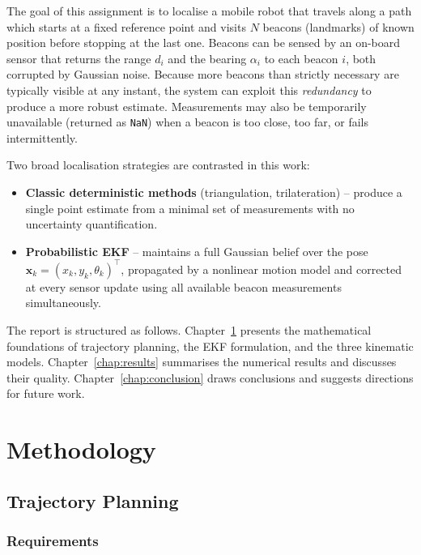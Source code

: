 \documentclass[a4paper,11pt]{report}
\begin{document}
The goal of this assignment is to localise a mobile robot that travels along a path which starts at a fixed reference point and visits $N$ beacons (landmarks) of known position before stopping at the last one.  Beacons can be sensed by an on-board sensor that returns the range $d_i$ and the bearing $\alpha_i$ to each beacon $i$, both corrupted by Gaussian noise.  Because more beacons than strictly necessary are typically visible at any instant, the system can exploit this \emph{redundancy} to produce a more robust estimate.  Measurements may also be temporarily unavailable (returned as \texttt{NaN}) when a beacon is too close, too far, or fails intermittently.

Two broad localisation strategies are contrasted in this work:
\begin{itemize}
  \item \textbf{Classic deterministic methods} (triangulation, trilateration) -- produce a single point estimate from a minimal set of measurements with no uncertainty quantification.
  \item \textbf{Probabilistic EKF} -- maintains a full Gaussian belief over the pose $\bm{x}_k = (x_k, y_k, \theta_k)^\top$, propagated by a nonlinear motion model and corrected at every sensor update using all available beacon measurements simultaneously.
\end{itemize}

The report is structured as follows.  Chapter~\ref{chap:methodology} presents the mathematical foundations of trajectory planning, the EKF formulation, and the three kinematic models.  Chapter~\ref{chap:results} summarises the numerical results and discusses their quality.  Chapter~\ref{chap:conclusion} draws conclusions and suggests directions for future work.

\chapter{Methodology}
\label{chap:methodology}

\section{Trajectory Planning}

\subsection{Requirements}
\end{document}
